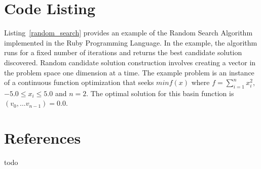 \documentclass[a4paper, 11pt]{article}
\begin{document}
\section{Code Listing}
\label{sec:code}
Listing~\ref{random_search} provides an example of the Random Search Algorithm implemented in the Ruby Programming Language. 
In the example, the algorithm runs for a fixed number of iterations and returns the best candidate solution discovered. Random candidate solution construction involves creating a vector in the problem space one dimension at a time.
The example problem is an instance of a continuous function optimization that seeks $min f(x)$ where $f=\sum_{i=1}^n x_{i}^2$, $-5.0\leq x_i \leq 5.0$ and $n=2$. The optimal solution for this basin function is $(v_0,\ldots v_{n-1})=0.0$.



\section{References}
\label{sec:references}
todo
\end{document}
